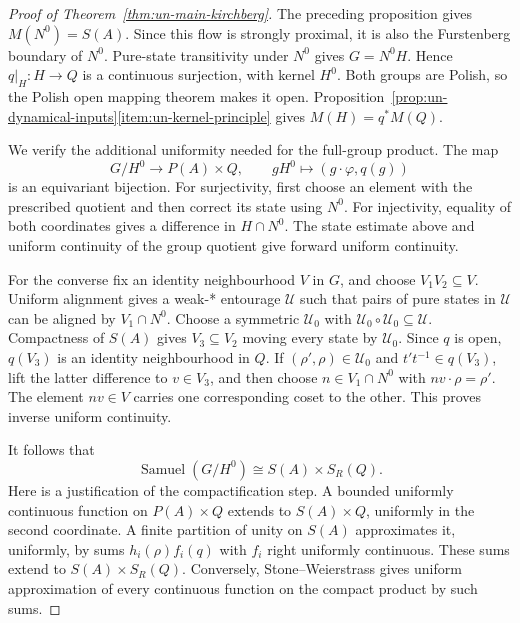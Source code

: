 \begin{proof}[Proof of Theorem~\ref{thm:un-main-kirchberg}]
The preceding proposition gives \(M(N^0)=S(A)\).
Since this flow is strongly proximal, it is also the Furstenberg
boundary of \(N^0\).
Pure-state transitivity under \(N^0\) gives \(G=N^0H\). Hence
\(q|_H:H\to Q\) is a continuous surjection, with kernel \(H^0\).
Both groups are Polish, so the Polish open mapping theorem makes
it open. Proposition~\ref{prop:un-dynamical-inputs}\ref{item:un-kernel-principle} gives \(M(H)=q^*M(Q)\).

We verify the additional uniformity needed for the full-group product.
The map
\begin{equation}\label{eq:un-quotient-product}
 G/H^0\longrightarrow P(A)\times Q,\qquad
 gH^0\longmapsto(g\cdot\varphi,q(g))
\end{equation}
is an equivariant bijection. For surjectivity, first choose an element
with the prescribed quotient and then correct its state using \(N^0\).
For injectivity, equality of both coordinates gives a difference
in \(H\cap N^0\).
The state estimate above and uniform continuity of the group quotient
give forward uniform continuity.

For the converse fix an identity neighbourhood \(V\) in \(G\), and
choose \(V_1V_2\subseteq V\). Uniform alignment gives a weak-*
entourage \(\mathcal U\) such that pairs of pure states in
\(\mathcal U\) can be aligned by \(V_1\cap N^0\).
Choose a symmetric \(\mathcal U_0\) with
\(\mathcal U_0\circ\mathcal U_0\subseteq\mathcal U\).
Compactness of \(S(A)\) gives \(V_3\subseteq V_2\) moving every
state by \(\mathcal U_0\). Since \(q\) is open, \(q(V_3)\) is an
identity neighbourhood in \(Q\).
If \((\rho',\rho)\in\mathcal U_0\) and \(t't^{-1}\in q(V_3)\),
lift the latter difference to \(v\in V_3\), and then choose
\(n\in V_1\cap N^0\) with \(nv\cdot\rho=\rho'\).
The element \(nv\in V\) carries one corresponding coset to the
other. This proves inverse uniform continuity.

It follows that
\begin{equation}\label{eq:un-samuel-product}
 \operatorname{Samuel}(G/H^0)\cong S(A)\times S_R(Q).
\end{equation}
Here is a justification of the compactification step. A bounded
uniformly continuous function on \(P(A)\times Q\) extends to
\(S(A)\times Q\), uniformly in the second coordinate.
A finite partition of unity on \(S(A)\) approximates it, uniformly,
by sums \(h_i(\rho)f_i(q)\) with \(f_i\) right uniformly continuous.
These sums extend to \(S(A)\times S_R(Q)\).
Conversely, Stone--Weierstrass gives uniform approximation of every
continuous function on the compact product by such sums.


\end{proof}
